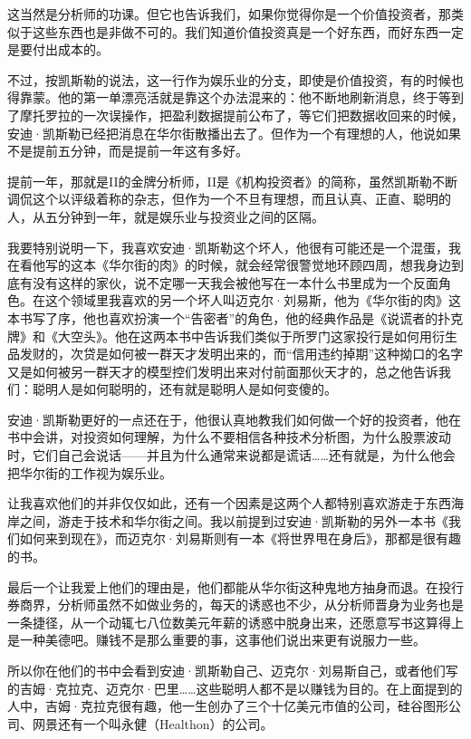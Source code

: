 这当然是分析师的功课。但它也告诉我们，如果你觉得你是一个价值投资者，那类似于这些东西也是非做不可的。我们知道价值投资真是一个好东西，而好东西一定是要付出成本的。

不过，按凯斯勒的说法，这一行作为娱乐业的分支，即使是价值投资，有的时候也得靠蒙。他的第一单漂亮活就是靠这个办法混来的：他不断地刷新消息，终于等到了摩托罗拉的一次误操作，把盈利数据提前公布了，等它们把数据收回来的时候，安迪·凯斯勒已经把消息在华尔街散播出去了。但作为一个有理想的人，他说如果不是提前五分钟，而是提前一年这有多好。

提前一年，那就是II的金牌分析师，II是《机构投资者》的简称，虽然凯斯勒不断调侃这个以评级着称的杂志，但作为一个不旦有理想，而且认真、正直、聪明的人，从五分钟到一年，就是娱乐业与投资业之间的区隔。

我要特别说明一下，我喜欢安迪·凯斯勒这个坏人，他很有可能还是一个混蛋，我在看他写的这本《华尔街的肉》的时候，就会经常很警觉地环顾四周，想我身边到底有没有这样的家伙，说不定哪一天我会被他写在一本什么书里成为一个反面角色。在这个领域里我喜欢的另一个坏人叫迈克尔·刘易斯，他为《华尔街的肉》这本书写了序，他也喜欢扮演一个``告密者''的角色，他的经典作品是《说谎者的扑克牌》和《大空头》。他在这两本书中告诉我们类似于所罗门这家投行是如何用衍生品发财的，次贷是如何被一群天才发明出来的，而``信用违约掉期''这种拗口的名字又是如何被另一群天才的模型控们发明出来对付前面那伙天才的，总之他告诉我们：聪明人是如何聪明的，还有就是聪明人是如何变傻的。

安迪·凯斯勒更好的一点还在于，他很认真地教我们如何做一个好的投资者，他在书中会讲，对投资如何理解，为什么不要相信各种技术分析图，为什么股票波动时，它们自己会说话------并且为什么通常来说都是谎话\ldots{}\ldots{}还有就是，为什么他会把华尔街的工作视为娱乐业。

让我喜欢他们的并非仅仅如此，还有一个因素是这两个人都特别喜欢游走于东西海岸之间，游走于技术和华尔街之间。我以前提到过安迪·凯斯勒的另外一本书《我们如何来到现在》，而迈克尔·刘易斯则有一本《将世界甩在身后》，那都是很有趣的书。

最后一个让我爱上他们的理由是，他们都能从华尔街这种鬼地方抽身而退。在投行券商界，分析师虽然不如做业务的，每天的诱惑也不少，从分析师晋身为业务也是一条捷径，从一个动辄七八位数美元年薪的诱惑中脱身出来，还愿意写书这算得上是一种美德吧。赚钱不是那么重要的事，这事他们说出来更有说服力一些。

所以你在他们的书中会看到安迪·凯斯勒自己、迈克尔·刘易斯自己，或者他们写的吉姆·克拉克、迈克尔·巴里\ldots{}\ldots{}这些聪明人都不是以赚钱为目的。在上面提到的人中，吉姆·克拉克很有趣，他一生创办了三个十亿美元市值的公司，硅谷图形公司、网景还有一个叫永健（Healthon）的公司。

